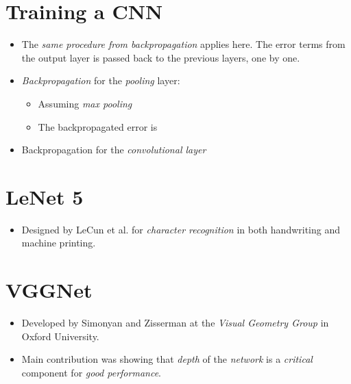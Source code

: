 \documentclass[
	number={9},
	title={Convolutional Neural Network}
]{cs584notes}
\begin{document}
\section{Training a CNN}\label{sec:training-a-cnn}
\begin{itemize}
	\item The \emph{same procedure from backpropagation} applies here.
	The error terms from the output layer is passed back to the previous layers, one by one.
	\item \emph{Backpropagation} for the \emph{pooling} layer:
	\begin{itemize}
		\item Assuming \emph{max pooling}
		\item The backpropagated error is 
	\end{itemize}
	\item Backpropagation for the \emph{convolutional layer}
\end{itemize}

\section{LeNet 5}\label{sec:lenet-5}
\begin{itemize}
	\item Designed by LeCun et al. for \emph{character recognition} in both handwriting and machine printing.
\end{itemize}

\section{VGGNet}\label{sec:vggnet}
\begin{itemize}
	\item Developed by Simonyan and Zisserman at the \emph{Visual Geometry Group} in Oxford University.
	\item Main contribution was showing that \emph{depth} of the \emph{network} is a \emph{critical} component for \emph{good performance}.
\end{itemize}
\end{document}
